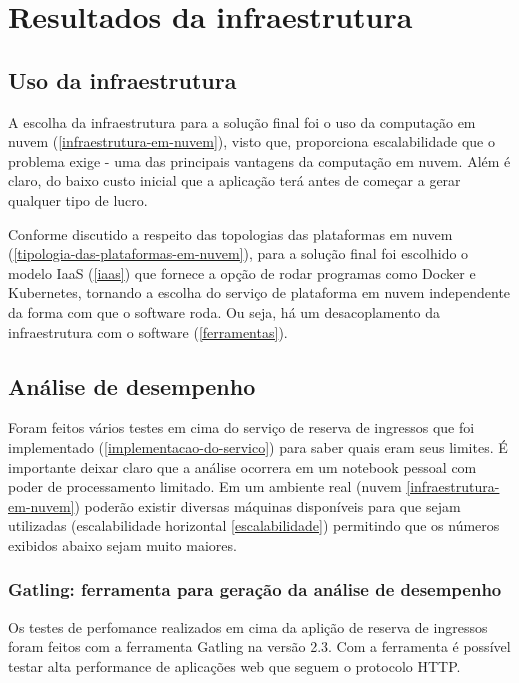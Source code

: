 \chapter{Resultados da infraestrutura}

\section{Uso da infraestrutura}

A escolha da infraestrutura para a solução final foi o uso da
computação em nuvem (\autoref{infraestrutura-em-nuvem}), visto que, proporciona
escalabilidade que o problema exige - uma das principais vantagens da computação em nuvem.
Além é claro, do baixo custo inicial que a aplicação terá antes de começar a gerar qualquer
tipo de lucro.

Conforme discutido a respeito das topologias das plataformas em
nuvem (\autoref{tipologia-das-plataformas-em-nuvem}), para a solução final foi escolhido o
modelo IaaS (\autoref{iaas}) que fornece a opção de rodar programas como Docker e
Kubernetes, tornando a escolha do serviço de plataforma em nuvem independente da forma
com que o software roda. Ou seja, há um desacoplamento da infraestrutura com o software
(\autoref{ferramentas}).

\section{Análise de desempenho}

Foram feitos vários testes em cima do serviço de reserva de ingressos que foi implementado
(\autoref{implementacao-do-servico}) para saber quais eram seus limites.
É importante deixar claro que a análise ocorrera em um notebook pessoal com poder
de processamento limitado. Em um ambiente real (nuvem \autoref{infraestrutura-em-nuvem})
poderão existir diversas máquinas disponíveis para que sejam utilizadas
(escalabilidade horizontal \autoref{escalabilidade})
permitindo que os números exibidos abaixo sejam muito maiores.

\subsection{Gatling: ferramenta para geração da análise de desempenho}

Os testes de perfomance realizados em cima da aplição de reserva de ingressos foram
feitos com a ferramenta Gatling na versão 2.3.
Com a ferramenta é possível testar alta performance de aplicações web
\cite{gatling-docs} que seguem o protocolo HTTP.

